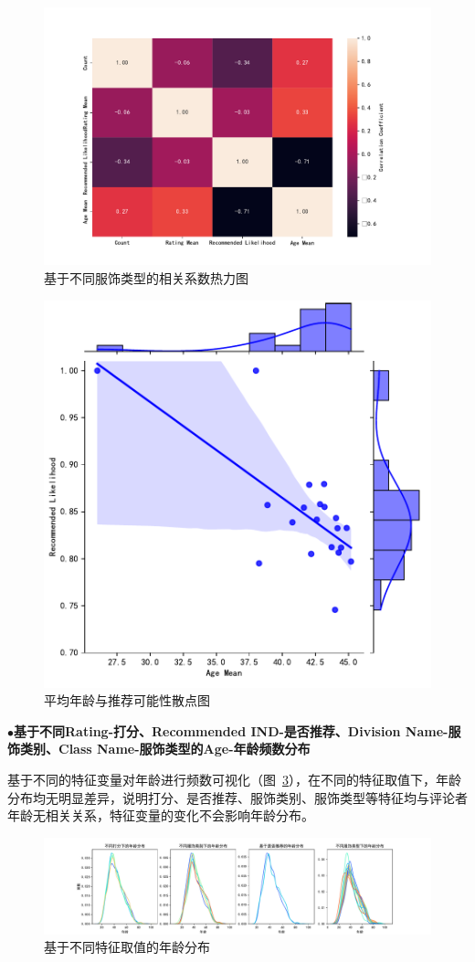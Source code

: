 \documentclass[
  journal=medium,
  manuscript=article-type,
  year=2023,
  volume=37,
]{cup-journal}
\begin{document}
\begin{figure}[H]
    \centering
    \includegraphics[width=0.8\linewidth]{corr2.pdf}
    \caption{基于不同服饰类型的相关系数热力图}
    \label{corr2}
\end{figure}


\begin{figure}[hbt!]
    \centering
    \includegraphics[width=0.6\linewidth]{corr3.pdf}
    \caption{平均年龄与推荐可能性散点图}
    \label{corr3}
\end{figure}


$\bullet$\textbf{基于不同Rating-打分、Recommended IND-是否推荐、Division Name-服饰类别、Class Name-服饰类型的Age-年龄频数分布}

基于不同的特征变量对年龄进行频数可视化（图~\ref{age_others}），在不同的特征取值下，年龄分布均无明显差异，说明打分、是否推荐、服饰类别、服饰类型等特征均与评论者年龄无相关关系，特征变量的变化不会影响年龄分布。

\begin{figure}[hbt!]
    \centering
    \includegraphics[width=1.1\linewidth]{age_others.pdf}
    \caption{基于不同特征取值的年龄分布}
    \label{age_others}
\end{figure}
\end{document}
